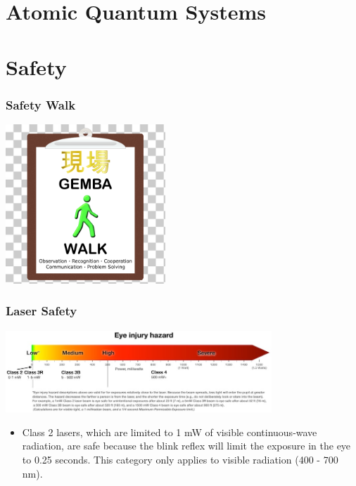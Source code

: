 \documentclass{beamer}
\begin{document}
\section{Atomic Quantum Systems}


\section{Safety}

\begin{frame}\frametitle{Safety Walk}
\begin{center}
\includegraphics[width=6cm]{fig/gemba.png}
\end{center}
\end{frame}


\begin{frame}\frametitle{Laser Safety}

\begin{center}
\includegraphics[width=10cm]{fig/lsafe.png}
\end{center}

\begin{itemize}
\item Class 2 lasers, which are limited to 1 mW of visible continuous-wave radiation, are safe because the blink reflex will limit the exposure in the eye to 0.25 seconds. This category only applies to visible radiation (400 - 700 nm).
\end{itemize}

\end{frame}
\end{document}
